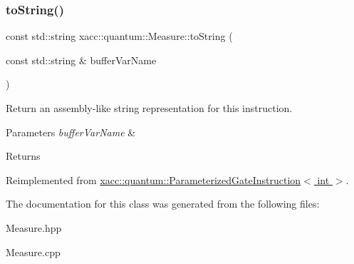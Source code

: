 \subsubsection{\texorpdfstring{to\+String()}{toString()}}
{\footnotesize\ttfamily const std\+::string xacc\+::quantum\+::\+Measure\+::to\+String (\begin{DoxyParamCaption}\item[{const std\+::string \&}]{buffer\+Var\+Name }\end{DoxyParamCaption})\hspace{0.3cm}{\ttfamily [virtual]}}

Return an assembly-\/like string representation for this instruction.


\begin{DoxyParams}{Parameters}
{\em buffer\+Var\+Name} & \\
\hline
\end{DoxyParams}
\begin{DoxyReturn}{Returns}

\end{DoxyReturn}


Reimplemented from \hyperlink{a01280_aaccc4a20d58d2ac5c31abe7e325b8f77}{xacc\+::quantum\+::\+Parameterized\+Gate\+Instruction$<$ int $>$}.



The documentation for this class was generated from the following files\+:\begin{DoxyCompactItemize}
\item 
Measure.\+hpp\item 
Measure.\+cpp\end{DoxyCompactItemize}
